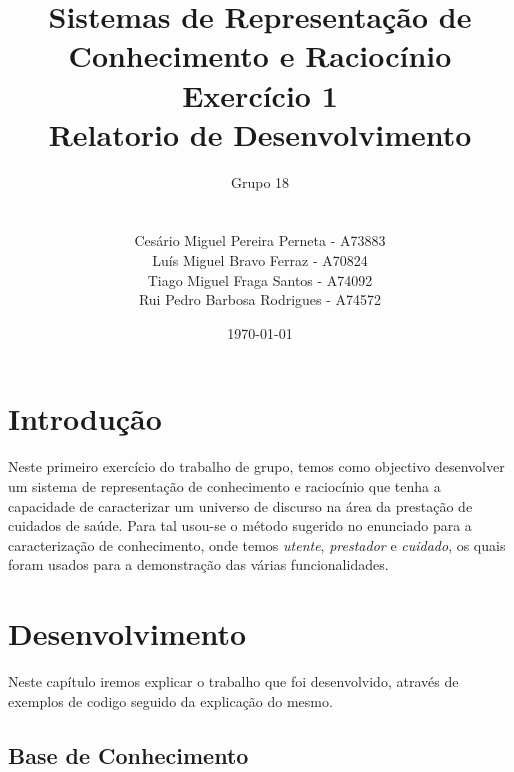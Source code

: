 \documentclass[a4paper]{report} %
\begin{document}
\title{Sistemas de Representação de Conhecimento e Raciocínio\\Exercício 1\\Relatorio de Desenvolvimento}
\author{Grupo 18\\
\\
\\
Cesário Miguel Pereira Perneta - A73883
\\
Luís Miguel Bravo Ferraz - A70824
\\
Tiago Miguel Fraga Santos - A74092
\\
Rui Pedro Barbosa Rodrigues - A74572}

\date{\today}

\maketitle

\tableofcontents

\chapter{Introdução}

Neste primeiro exercício do trabalho de grupo, temos como objectivo desenvolver um sistema de representação de conhecimento e raciocínio que tenha a capacidade de caracterizar um universo de discurso na área da prestação de cuidados de saúde. Para tal usou-se o método sugerido no enunciado para a caracterização de conhecimento, onde temos \textit{utente}, \textit{prestador} e \textit{cuidado}, os quais foram usados para a demonstração das várias funcionalidades.
 
\chapter{Desenvolvimento}

Neste capítulo iremos explicar o trabalho que foi desenvolvido, através de exemplos de codigo seguido da explicação do mesmo.

\section{Base de Conhecimento}
\end{document}
